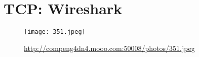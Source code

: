 \section*{TCP: Wireshark}

\begin{figure}[htp]
\centering
\caption[mooo]{\url{http://compeng4dn4.mooo.com:50008/photos/351.jpeg}}
\texttt{[image: 351.jpeg]}
\end{figure}